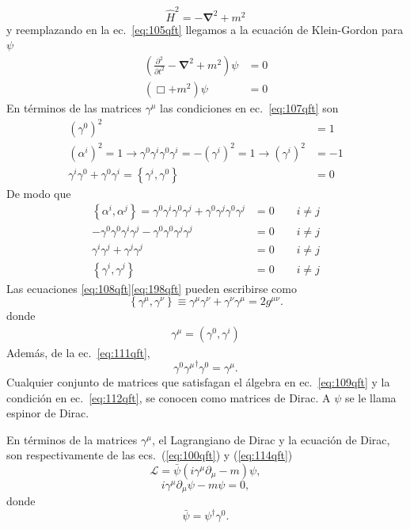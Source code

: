 \begin{equation}
  \hat{H}^2=-\boldsymbol{\nabla}^2+m^2
\end{equation}
y reemplazando en la ec.~\eqref{eq:105qft} llegamos a la ecuación de Klein-Gordon para $\psi$
\begin{align}
   \left(\frac{\partial^2}{\partial t^2}-\boldsymbol{\nabla}^2+m^2\right)\psi&=0\nonumber\\
   \left(\Box+m^2\right)\psi&=0
\end{align}
En términos de las matrices $\gamma^\mu$ las condiciones en ec.~\eqref{eq:107qft} son
\begin{align}
  \label{eq:108qft}
  \left({\gamma^0}\right)^2&=1\nonumber\\
  \left({\alpha^i}\right)^2=1\to\gamma^0\gamma^i \gamma^0\gamma^i=-\left({\gamma^i}\right)^2=1\to\left({\gamma^i}\right)^2&=-1\nonumber\\
  \gamma^i \gamma^0+\gamma^0\gamma^i=\left\{\gamma^i,\gamma^0\right\}&=0
\end{align}
De modo que
\begin{align}
  \label{eq:198qft}
\left\{\alpha^i,\alpha^j\right\}=\gamma^0\gamma^i \gamma^0\gamma^j+\gamma^0\gamma^j \gamma^0\gamma^j&=0\qquad i\neq j\nonumber\\
-\gamma^0\gamma^0\gamma^i \gamma^j-\gamma^0\gamma^0\gamma^j \gamma^j&=0\qquad i\neq j\nonumber\\
\gamma^i \gamma^j+\gamma^j \gamma^j&=0\qquad i\neq j\nonumber\\
\left\{\gamma^i,\gamma^j\right\}&=0\qquad i\neq j
\end{align}
Las ecuaciones \eqref{eq:108qft}\eqref{eq:198qft} pueden escribirse como
\begin{equation}
  \label{eq:109qft}
  \left\{\gamma^\mu,\gamma^\nu\right\}\equiv\gamma^\mu\gamma^\nu+\gamma^\nu\gamma^\mu=2g^{\mu\nu}.
\end{equation}
donde
\begin{align}
  \gamma^\mu=(\gamma^0,\gamma^i)
\end{align}
Además, de la ec.~\eqref{eq:111qft},
\begin{equation}
  \label{eq:112qft}
   \gamma^0{\gamma^\mu}^\dagger \gamma^0=\gamma^\mu.
\end{equation}
Cualquier conjunto de matrices que satisfagan el álgebra en ec.~\eqref{eq:109qft} y la condición en ec.~\eqref{eq:112qft}, se conocen como matrices de Dirac. A $\psi$ se le llama espinor de Dirac.

En términos de la matrices $\gamma^\mu$, el Lagrangiano de Dirac y la ecuación de Dirac, son respectivamente de las ecs.~(\ref{eq:100qft}) y (\ref{eq:114qft})
\begin{equation}
  \label{eq:115qft}
  \mathcal{L}=\bar{\psi}\left(i\gamma^\mu\partial_\mu-m\right)\psi,
\end{equation}
\begin{equation}
  \label{eq:116qft}
  i\gamma^\mu\partial_\mu\psi-m\psi=0,
\end{equation}
donde
\begin{equation}
  \bar{\psi}=\psi^\dagger\gamma^0.
\end{equation}




